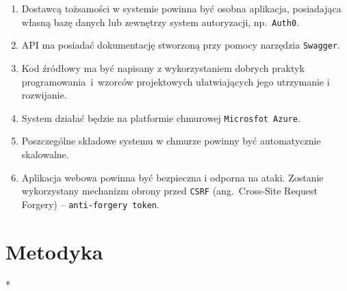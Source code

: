 \begin{enumerate}[labelwidth=1em,label=\arabic*.]
\item Dostawcą tożsamości w systemie powinna być osobna aplikacja, posiadająca własną bazę danych lub zewnętrzy system autoryzacji, np.~\texttt{Auth0}.

\item API ma posiadać dokumentację stworzoną przy pomocy narzędzia \texttt{Swagger}.

\item Kod źródłowy ma być napisany z wykorzystaniem dobrych praktyk programowania~i~wzorców projektowych ułatwiających jego utrzymanie i rozwijanie.

\item System działać będzie na platformie chmurowej \texttt{Microsfot Azure}.

\item Poszczególne składowe systemu w chmurze powinny być automatycznie skalowalne.

\item Aplikacja webowa powinna być bezpieczna i odporna na ataki. Zostanie wykorzystany mechanizm obrony przed \texttt{CSRF} (ang.~Cross-Site Request Forgery) -- \texttt{anti-forgery token}.

\end{enumerate}

\section{Metodyka}
\label{sec:metodyka}*